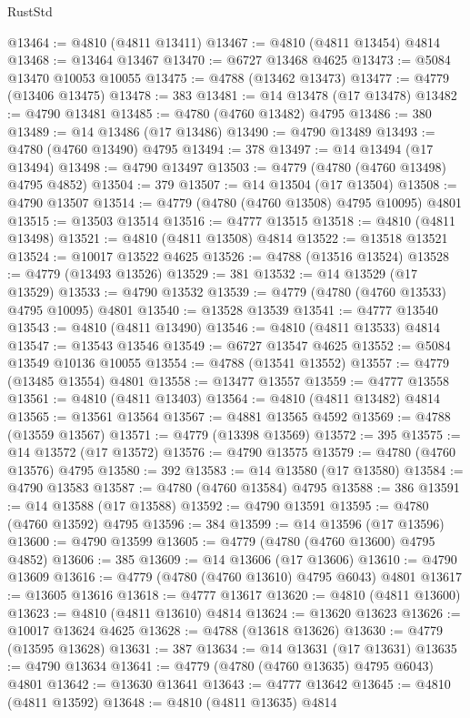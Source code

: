 \begin{lexlean}{RustStd}
\begin{coremodule}
@13464 := @4810 (@4811 @13411)
@13467 := @4810 (@4811 @13454) @4814
@13468 := @13464 @13467
@13470 := @6727 @13468 @4625
@13473 := @5084 @13470 @10053 @10055
@13475 := @4788 (@13462 @13473)
@13477 := @4779 (@13406 @13475)
@13478 := 383
@13481 := @14 @13478 (@17 @13478)
@13482 := @4790 @13481
@13485 := @4780 (@4760 @13482) @4795
@13486 := 380
@13489 := @14 @13486 (@17 @13486)
@13490 := @4790 @13489
@13493 := @4780 (@4760 @13490) @4795
@13494 := 378
@13497 := @14 @13494 (@17 @13494)
@13498 := @4790 @13497
@13503 := @4779 (@4780 (@4760 @13498) @4795 @4852)
@13504 := 379
@13507 := @14 @13504 (@17 @13504)
@13508 := @4790 @13507
@13514 := @4779 (@4780 (@4760 @13508) @4795 @10095) @4801
@13515 := @13503 @13514
@13516 := @4777 @13515
@13518 := @4810 (@4811 @13498)
@13521 := @4810 (@4811 @13508) @4814
@13522 := @13518 @13521
@13524 := @10017 @13522 @4625
@13526 := @4788 (@13516 @13524)
@13528 := @4779 (@13493 @13526)
@13529 := 381
@13532 := @14 @13529 (@17 @13529)
@13533 := @4790 @13532
@13539 := @4779 (@4780 (@4760 @13533) @4795 @10095) @4801
@13540 := @13528 @13539
@13541 := @4777 @13540
@13543 := @4810 (@4811 @13490)
@13546 := @4810 (@4811 @13533) @4814
@13547 := @13543 @13546
@13549 := @6727 @13547 @4625
@13552 := @5084 @13549 @10136 @10055
@13554 := @4788 (@13541 @13552)
@13557 := @4779 (@13485 @13554) @4801
@13558 := @13477 @13557
@13559 := @4777 @13558
@13561 := @4810 (@4811 @13403)
@13564 := @4810 (@4811 @13482) @4814
@13565 := @13561 @13564
@13567 := @4881 @13565 @4592
@13569 := @4788 (@13559 @13567)
@13571 := @4779 (@13398 @13569)
@13572 := 395
@13575 := @14 @13572 (@17 @13572)
@13576 := @4790 @13575
@13579 := @4780 (@4760 @13576) @4795
@13580 := 392
@13583 := @14 @13580 (@17 @13580)
@13584 := @4790 @13583
@13587 := @4780 (@4760 @13584) @4795
@13588 := 386
@13591 := @14 @13588 (@17 @13588)
@13592 := @4790 @13591
@13595 := @4780 (@4760 @13592) @4795
@13596 := 384
@13599 := @14 @13596 (@17 @13596)
@13600 := @4790 @13599
@13605 := @4779 (@4780 (@4760 @13600) @4795 @4852)
@13606 := 385
@13609 := @14 @13606 (@17 @13606)
@13610 := @4790 @13609
@13616 := @4779 (@4780 (@4760 @13610) @4795 @6043) @4801
@13617 := @13605 @13616
@13618 := @4777 @13617
@13620 := @4810 (@4811 @13600)
@13623 := @4810 (@4811 @13610) @4814
@13624 := @13620 @13623
@13626 := @10017 @13624 @4625
@13628 := @4788 (@13618 @13626)
@13630 := @4779 (@13595 @13628)
@13631 := 387
@13634 := @14 @13631 (@17 @13631)
@13635 := @4790 @13634
@13641 := @4779 (@4780 (@4760 @13635) @4795 @6043) @4801
@13642 := @13630 @13641
@13643 := @4777 @13642
@13645 := @4810 (@4811 @13592)
@13648 := @4810 (@4811 @13635) @4814

\end{coremodule}
\end{lexlean}

